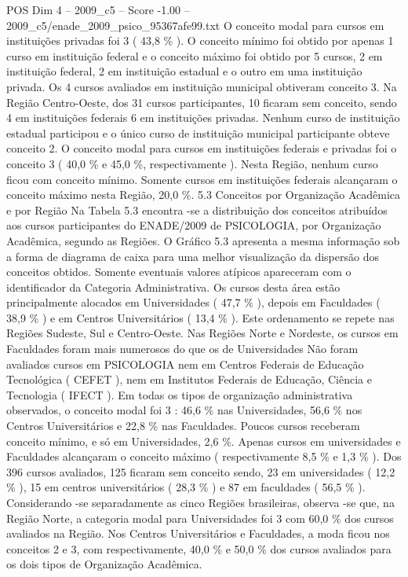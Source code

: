 \begin{textsample}{POS Dim 4 – 2009\_c5 – Score -1.00 – 2009\_c5/enade\_2009\_psico\_95367afe99.txt}
O conceito modal para cursos em instituições privadas foi 3 ( 43,8 \% ).
O conceito mínimo foi obtido por apenas 1 curso em instituição federal e o conceito máximo foi obtido por 5 cursos, 2 em instituição federal, 2 em instituição estadual e o outro em uma instituição privada.
Os 4 cursos avaliados em instituição municipal obtiveram conceito 3.
Na Região Centro-Oeste, dos 31 cursos participantes, 10 ficaram sem conceito, sendo 4 em instituições federais 6 em instituições privadas.
Nenhum curso de instituição estadual participou e o único curso de instituição municipal participante obteve conceito 2.
O conceito modal para cursos em instituições federais e privadas foi o conceito 3 ( 40,0 \% e 45,0 \%, respectivamente ).
Nesta Região, nenhum curso ficou com conceito mínimo.
Somente cursos em instituições federais alcançaram o conceito máximo nesta Região, 20,0 \%. 5.3 Conceitos por Organização Acadêmica e por Região Na Tabela 5.3 encontra -se a distribuição dos conceitos atribuídos aos cursos participantes do ENADE/2009 de PSICOLOGIA, por Organização Acadêmica, segundo as Regiões.
O Gráfico 5.3 apresenta a mesma informação sob a forma de diagrama de caixa para uma melhor visualização da dispersão dos conceitos obtidos.
Somente eventuais valores atípicos apareceram com o identificador da Categoria Administrativa.
Os cursos desta área estão principalmente alocados em Universidades ( 47,7 \% ), depois em Faculdades ( 38,9 \% ) e em Centros Universitários ( 13,4 \% ).
Este ordenamento se repete nas Regiões Sudeste, Sul e Centro-Oeste.
Nas Regiões Norte e Nordeste, os cursos em Faculdades foram mais numerosos do que os de Universidades Não foram avaliados cursos em PSICOLOGIA nem em Centros Federais de Educação Tecnológica ( CEFET ), nem em Institutos Federais de Educação, Ciência e Tecnologia ( IFECT ).
Em todas os tipos de organização administrativa observados, o conceito modal foi 3 : 46,6 \% nas Universidades, 56,6 \% nos Centros Universitários e 22,8 \% nas Faculdades.
Poucos cursos receberam conceito mínimo, e só em Universidades, 2,6 \%.
Apenas cursos em universidades e Faculdades alcançaram o conceito máximo ( respectivamente 8,5 \% e 1,3 \% ).
Dos 396 cursos avaliados, 125 ficaram sem conceito sendo, 23 em universidades ( 12,2 \% ), 15 em centros universitários ( 28,3 \% ) e 87 em faculdades ( 56,5 \% ).
Considerando -se separadamente as cinco Regiões brasileiras, observa -se que, na Região Norte, a categoria modal para Universidades foi 3 com 60,0 \% dos cursos avaliados na Região.
Nos Centros Universitários e Faculdades, a moda ficou nos conceitos 2 e 3, com respectivamente, 40,0 \% e 50,0 \% dos cursos avaliados para os dois tipos de Organização Acadêmica.

\end{textsample}
